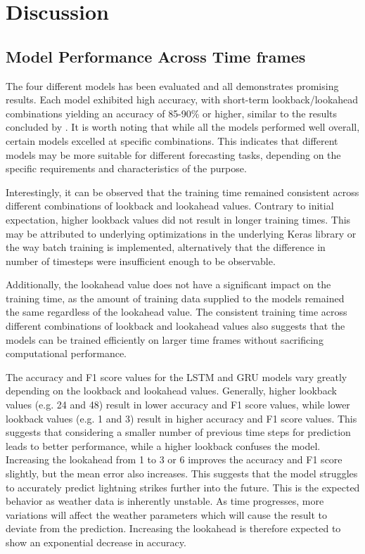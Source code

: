 \chapter{Discussion}
\label{sec:discussion}

\section{Model Performance Across Time frames}

The four different models has been evaluated and all demonstrates promising results. Each model exhibited high accuracy, with short-term lookback/lookahead combinations yielding an accuracy of 85-90\% or higher, similar to the results concluded by \textcite{new3}. It is worth noting that while all the models performed well overall, certain models excelled at specific combinations. This indicates that different models may be more suitable for different forecasting tasks, depending on the specific requirements and characteristics of the purpose.

Interestingly, it can be observed that the training time remained consistent across different combinations of lookback and lookahead values. Contrary to initial expectation, higher lookback values did not result in longer training times. This may be attributed to underlying optimizations in the underlying Keras library or the way batch training is implemented, alternatively that the difference in number of timesteps were insufficient enough to be observable.

Additionally, the lookahead value does not have a significant impact on the training time, as the amount of training data supplied to the models remained the same regardless of the lookahead value. The consistent training time across different combinations of lookback and lookahead values also suggests that the models can be trained efficiently on larger time frames without sacrificing computational performance.

The accuracy and F1 score values for the LSTM and GRU models vary greatly depending on the lookback and lookahead values. Generally, higher lookback values (e.g. 24 and 48) result in lower accuracy and F1 score values, while lower lookback values (e.g. 1 and 3) result in higher accuracy and F1 score values. This suggests that considering a smaller number of previous time steps for prediction leads to better performance, while a higher lookback confuses the model. Increasing the lookahead from 1 to 3 or 6 improves the accuracy and F1 score slightly, but the mean error also increases. This suggests that the model struggles to accurately predict lightning strikes further into the future. This is the expected behavior as weather data is inherently unstable. As time progresses, more variations will affect the weather parameters which will cause the result to deviate from the prediction. Increasing the lookahead is therefore expected to show an exponential decrease in accuracy.

